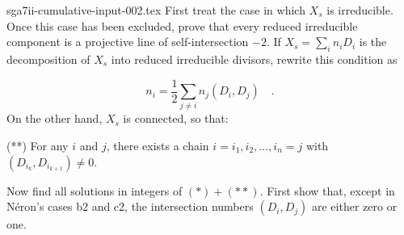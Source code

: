\begin{filecontents*}{sga7ii-cumulative-input-002.tex}
First treat the case in which $X_s$ is irreducible.  Once this case has been
excluded, prove that every reduced irreducible component is a projective line of
self-intersection $-2$.  If $X_s=\sum_i n_iD_i$ is the decomposition of $X_s$
into reduced irreducible divisors, rewrite this condition as

\begin{equation}\tag{*}
n_i=\frac12\sum_{j\ne i}n_j(D_i,D_j) \quad .
\end{equation}
On the other hand, $X_s$ is connected, so that:

(**) For any $i$ and $j$, there exists a chain
$i=i_1,i_2,\ldots,i_n=j$ with
$(D_{i_k},D_{i_{k+1}})\ne0$.

Now find all solutions in integers of $(*)+(**)$.  First show that, except in
Néron's cases b2 and c2, the intersection numbers $(D_i,D_j)$ are either zero or
one.

\end{filecontents*}
